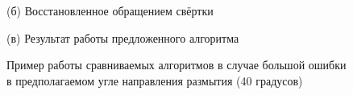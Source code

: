 \begin{figure}[H]
\begin{minipage}[t]{0.3\linewidth}
(б) Восстановленное обращением свёртки\\ 
\end{minipage}
\hfill
\begin{minipage}[t]{0.3\linewidth}
(в) Результат работы предложенного алгоритма\\ 
\end{minipage}
\caption{ Пример работы сравниваемых алгоритмов в случае большой ошибки в предполагаемом угле направления размытия (40 градусов) }
\label{ris:Wrong_angle}
\end{figure}


